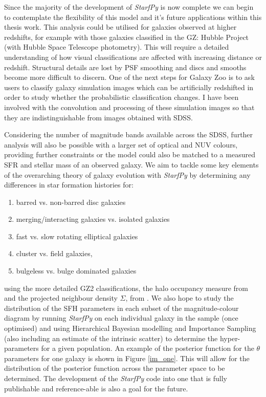 \documentclass{mn2e}
\begin{document}
Since the majority of the development of \emph{StarfPy} is now complete we can begin to contemplate the flexibility of this model and it's future applications within this thesis work. This analysis could be utilised for galaxies observed at higher redshifts, for example with those galaxies classified in the GZ: Hubble Project (with Hubble Space Telescope photometry). This will require a detailed understanding of how visual classifications are affected with increasing distance or redshift. Structural details are lost by PSF smoothing and discs and smooths become more difficult to discern. One of the next steps for Galaxy Zoo is to ask users to classify galaxy simulation images which can be artificially redshifted in order to study whether the probabilistic classification changes. I have been involved with the convolution and processing of these simulation images so that they are indistinguishable from images obtained with SDSS. 

Considering the number of magnitude bands available across the SDSS, further analysis will also be possible with a larger set of optical and NUV colours, providing further constraints or the model could also be matched to a measured SFR and stellar mass of an observed galaxy. We aim to tackle some key elements of the overarching theory of galaxy evolution with \emph{StarfPy} by determining any differences in star formation histories for:
\begin{enumerate}
\item barred vs. non-barred disc galaxies
\item merging/interacting galaxies vs. isolated galaxies
\item fast vs. slow rotating elliptical galaxies
\item cluster vs. field galaxies,
\item bulgeless vs. bulge dominated galaxies
\end{enumerate}
using the more detailed GZ2 classifications, the halo occupancy measure from \citep{Yang07} and the projected neighbour density $\Sigma$, from \citet{Baldry06}. We also hope to study the distribution of the SFH parameters in each subset of the magnitude-colour diagram by running \emph{StarfPy} on each individual galaxy in the sample (once optimised) and using Hierarchical Bayesian modelling and Importance Sampling (also including an estimate of the intrinsic scatter) to determine the hyper-parameters for a given population. An example of the posterior function for the $\theta$ parameters for one galaxy is shown in Figure \ref{im_one}. This will allow for the distribution of the posterior function across the parameter space to be determined. The development of the \emph{StarfPy} code into one that is fully publishable and reference-able is also a goal for the future. 
\end{document}
